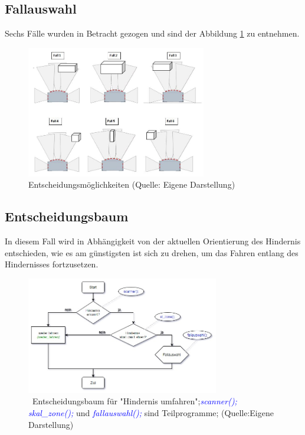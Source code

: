 \subsection{Fallauswahl}

Sechs Fälle wurden in Betracht gezogen und sind der Abbildung \ref{faelle} zu entnehmen.

\begin{figure}[!h]  %
	\centering\includegraphics[width=0.7\textwidth]{images/faelle.jpg}
	\caption{ Entscheidungsmöglichkeiten \newline (Quelle: Eigene Darstellung)}
	\label{faelle} %
\end{figure}

\subsection{Entscheidungsbaum}

In diesem Fall wird in Abhängigkeit von der aktuellen Orientierung des Hindernis entschieden, wie es am günstigsten ist sich zu drehen, um das Fahren entlang des Hindernisses fortzusetzen. 

\begin{figure}[!h] 
	\centering\includegraphics[width=0.75\textwidth]{images/Entsch-baum1.jpg}
	\caption{ \ Entscheidungsbaum für "Hindernis umfahren";\textcolor{blue}{\textit{scanner(); skal\_zone();}} und \textcolor{blue}{\textit {fallauswahl();}} sind Teilprogramme;   (Quelle:Eigene Darstellung)}
	\label{baum1} 
\end{figure}

